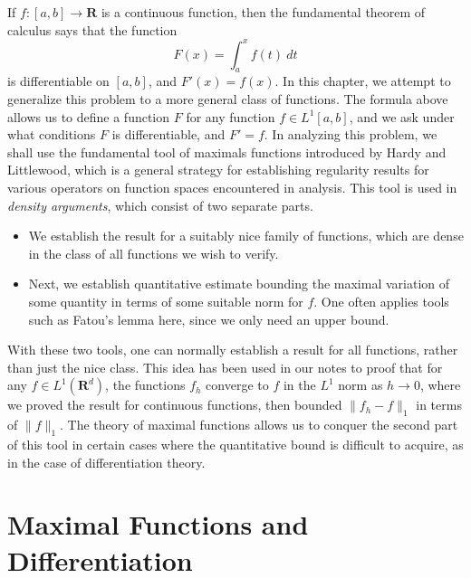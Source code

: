 If $f: [a,b] \to \mathbf{R}$ is a continuous function, then the fundamental theorem of calculus says that the function
%
\[ F(x) = \int_a^x f(t)\ dt \]
%
is differentiable on $[a,b]$, and $F'(x) = f(x)$. In this chapter, we attempt to generalize this problem to a more general class of functions. The formula above allows us to define a function $F$ for any function $f \in L^1[a,b]$, and we ask under what conditions $F$ is differentiable, and $F' = f$. In analyzing this problem, we shall use the fundamental tool of maximals functions introduced by Hardy and Littlewood, which is a general strategy for establishing regularity results for various operators on function spaces encountered in analysis. This tool is used in {\it density arguments}, which consist of two separate parts.
%
\begin{itemize}
  \item We establish the result for a suitably nice family of functions, which are dense in the class of all functions we wish to verify.
  \item Next, we establish quantitative estimate bounding the maximal variation of some quantity in terms of some suitable norm for $f$. One often applies tools such as Fatou's lemma here, since we only need an upper bound.
\end{itemize}
%
With these two tools, one can normally establish a result for all functions, rather than just the nice class. This idea has been used in our notes to proof that for any $f \in L^1(\mathbf{R}^d)$, the functions $f_h$ converge to $f$ in the $L^1$ norm as $h \to 0$, where we proved the result for continuous functions, then bounded $\| f_h - f \|_1$ in terms of $\| f \|_1$. The theory of maximal functions allows us to conquer the second part of this tool in certain cases where the quantitative bound is difficult to acquire, as in the case of differentiation theory.

\section{Maximal Functions and Differentiation}

